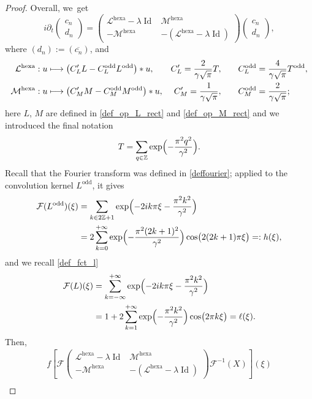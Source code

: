 \documentclass[JEP,XML,SOM,Unicode,NoFloatCountersInSection,published]{cedram}
\newcommand\mto{\mathchoice{\longmapsto}{\mapsto}{\mapsto}{\mapsto}}
\DeclareMathOperator{\Id}{Id}
\theoremstyle{definition}
\let\EE\exp
\let\ov\overline
\newcommand\Z{\mathbb Z}
\newcommand{\pa}[1]{\left(#1\right)}
\newcommand{\pac}[1]{\left[#1\right]}
\begin{document}
\begin{proof}
Overall, we~get
\begin{equation*}
i\partial_t \begin{pmatrix} c_n \\[2pt] d_n \end{pmatrix} = \begin{pmatrix} \mathcal{L}^{\text{hexa}}-\lambda \Id & \mathcal{M}^{\text{hexa}} \\[2pt] -\mathcal{M}^{\text{hexa}} & - (\mathcal{L}^{\text{hexa}}-\lambda \Id) \end{pmatrix} \begin{pmatrix} c_n \\[2pt] d_n \end{pmatrix},
\end{equation*}
where $(d_n):= (\ov{c_n})$, and
\begin{align*}
\mathcal{L}^{\text{hexa}} &: u \mto \pa{C_L' L- C_L^{\text{odd}}L^{\text{odd}}}* u, &C'_L=\frac{2}{\gamma\sqrt{\pi}}T, \qquad &C_L^{\text{odd}}=\frac{4}{\gamma\sqrt{\pi}}T^{\text{odd}},\\
\mathcal{M}^{\text{hexa}} &: u \mto \pa{C_M' M- C_M^{\text{odd}}M^{\text{odd}}}* u, &C'_M=\frac{1}{\gamma\sqrt{\pi}}, \qquad &C_M^{\text{odd}}=\frac{2}{\gamma\sqrt{\pi}};
\end{align*}
here $L$, $M$ are defined in \eqref{def_op_L_rect} and \eqref{def_op_M_rect} and we introduced the final notation
\[
T= \sum_{q \in \Z} \EE\Bigl(-\frac{\pi^2 q^2} {\gamma^2}\Bigr).
\]
Recall that the Fourier transform was defined in \eqref{deffourier}; applied to the convolution kernel $L^{\text{odd}}$, it gives
\begin{align}\label{def_fct_h}
\mathcal{F}(L^{\text{odd}})(\xi) &= \sum_{k \in 2\Z+1} \EE\Bigl(-2ik\pi \xi-\frac{\pi^2 k^2}{\gamma^2}\Bigr) \nonumber \\
&=2 \sum_{k=0}^{+\infty}\EE\Bigl(-\frac{\pi^2(2k+1)^2}{\gamma^2}\Bigr)\cos\bigl({2(2k+1)\pi \xi}\bigr)=: h(\xi),
\end{align}
and we recall \eqref{def_fct_l}
\begin{align}\label{def_fct_lb}
\mathcal{F}(L)(\xi) &= \sum_{k = -\infty}^{+\infty} \EE\Bigl(-2ik\pi \xi-\frac{\pi^2 k^2} {\gamma^2}\Bigr)\nonumber \\
&=1 + 2 \sum_{k=1}^{+\infty}\EE\Bigl({-\frac{\pi^2k^2}{\gamma^2}}\Bigr) \cos\bigl({2\pi k\xi}\bigr)= \ell(\xi).
\end{align}
Then,
\begin{multline}\label{defA}f
\pac{\mathcal{F}\begin{pmatrix} \mathcal{L}^{\text{hexa}}-\lambda \Id & \mathcal{M}^{\text{hexa}} \\[2pt] -\mathcal{M}^{\text{hexa}} & - (\mathcal{L}^{\text{hexa}}-\lambda \Id) \end{pmatrix}\mathcal{F}^{-1}(X)}\pa{\xi}\\

\end{multline}
\end{proof}
\end{document}
